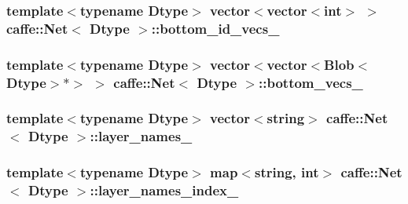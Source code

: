 \hypertarget{classcaffe_1_1_net_a49ce49e288297963f0d9f7a6d790daa6}{
\subsubsection[{bottom\+\_\+id\+\_\+vecs\+\_\+}]{\setlength{\rightskip}{0pt plus 5cm}template$<$typename Dtype$>$ vector$<$vector$<$int$>$ $>$ {\bf caffe\+::\+Net}$<$ Dtype $>$\+::bottom\+\_\+id\+\_\+vecs\+\_\+\hspace{0.3cm}{\ttfamily [protected]}}}\label{classcaffe_1_1_net_a49ce49e288297963f0d9f7a6d790daa6}
\hypertarget{classcaffe_1_1_net_ac5bf2007047f749d9d111b0dfa220afc}{
\subsubsection[{bottom\+\_\+vecs\+\_\+}]{\setlength{\rightskip}{0pt plus 5cm}template$<$typename Dtype$>$ vector$<$vector$<${\bf Blob}$<$Dtype$>$$\ast$$>$ $>$ {\bf caffe\+::\+Net}$<$ Dtype $>$\+::bottom\+\_\+vecs\+\_\+\hspace{0.3cm}{\ttfamily [protected]}}}\label{classcaffe_1_1_net_ac5bf2007047f749d9d111b0dfa220afc}
\hypertarget{classcaffe_1_1_net_ac792353f3cac826d97feea4b9eff3dff}{
\subsubsection[{layer\+\_\+names\+\_\+}]{\setlength{\rightskip}{0pt plus 5cm}template$<$typename Dtype$>$ vector$<$string$>$ {\bf caffe\+::\+Net}$<$ Dtype $>$\+::layer\+\_\+names\+\_\+\hspace{0.3cm}{\ttfamily [protected]}}}\label{classcaffe_1_1_net_ac792353f3cac826d97feea4b9eff3dff}
\hypertarget{classcaffe_1_1_net_a41db3e5f1fd7a28c58a2c605a6af0c3b}{
\subsubsection[{layer\+\_\+names\+\_\+index\+\_\+}]{\setlength{\rightskip}{0pt plus 5cm}template$<$typename Dtype$>$ map$<$string, int$>$ {\bf caffe\+::\+Net}$<$ Dtype $>$\+::layer\+\_\+names\+\_\+index\+\_\+\hspace{0.3cm}{\ttfamily [protected]}}}\label{classcaffe_1_1_net_a41db3e5f1fd7a28c58a2c605a6af0c3b}
